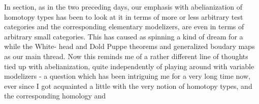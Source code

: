    In  section,  as in the two preceding days,  our emphasis
 with abelianization of homotopy types has been to look at it
in terms of more or less arbitrary test categories and the corresponding
elementary modelizers,  are even in terms of arbitrary small categories.
This has caused as spinning a kind of dream for a while\hand{,}  the White-%
head and Dold Puppe theorems  and generalized boudary maps as our main
thread.   Now this reminds me of a rather different line of thoughts
tied up with abelianization,  quite independently of playing around
with variable modelizers  -  a question which has been intriguing me
for a very long time now,  ever since  I  got acquainted a little with
the very notion of homotopy types,  and the corresponding homology and


